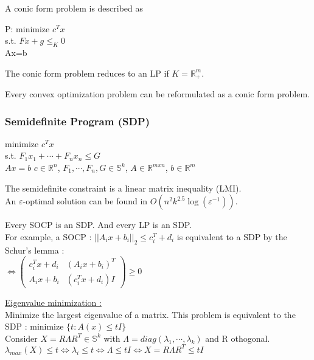 \documentclass[../main.tex]{subfiles}
\begin{document}
A conic form problem is described as \\
\begin{center}
    P: minimize $c^Tx$\\
    s.t. $Fx + g \leq_K 0$\\
    Ax=b
\end{center}

The conic form problem reduces to an LP if $K = \mathbb{R}_+^m$.\\

\begin{theorem}
    Every convex optimization problem can be reformulated as a conic form problem. 
\end{theorem}

\subsubsection{Semidefinite Program (SDP)}
\begin{center}
    minimize $c^Tx$\\
    s.t. $F_1x_1 + \cdots + F_n x_n \leq G$\\
    $Ax = b$
    $c \in \mathbb{R}^n$, $F_1, \cdots, F_n, G \in \mathbb{S}^k$, $A\in \mathbb{R}^{mxn}$, $b\in \mathbb{R}^m$
\end{center}

The semidefinite constraint is a linear matrix inequality (LMI). \\
An $\varepsilon$-optimal solution can be found in $O(n^2k^{2.5} \log(\varepsilon^{-1}))$.

\warning Every SOCP is an SDP. And every LP is an SDP.\\

For example, a SOCP : $\lvert \lvert A_ix + b_i \rvert \rvert_2 \leq c_i^T + d_i$ is equivalent to a SDP by the Schur's lemma :\\
$\Leftrightarrow \begin{pmatrix}
    c_i^Tx+d_i & (A_ix+b_i)^T\\
    A_ix + b_i & (c_i^Tx + d_i)I
\end{pmatrix} \geq 0$

\quad \underline{Eigenvalue minimization :}\\
Minimize the largest eigenvalue of a matrix. This problem is equivalent to the SDP : minimize $\{t: A(x) \leq tI\}$\\
Consider $X = R\Lambda R^T\in \mathbb{S}^k$ with $\Lambda = diag(\lambda_1, \cdots, \lambda_k)$ and R othogonal. $\lambda_{max}(X) \leq t \Leftrightarrow \lambda_i \leq t \Leftrightarrow \Lambda \leq tI \Leftrightarrow X = R\Lambda R^T \leq tI$\\
\end{document}
